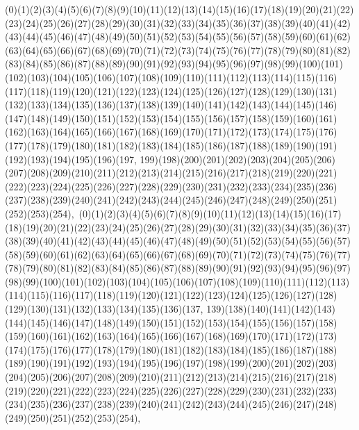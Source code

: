\documentclass[12pt]{article}
\begin{document}
{(0)(1)(2)(3)(4)(5)(6)(7)(8)(9)(10)(11)(12)(13)(14)(15)(16)(17)(18)(19)(20)(21)(22)(23)(24)(25)(26)(27)(28)(29)(30)(31)(32)(33)(34)(35)(36)(37)(38)(39)(40)(41)(42)(43)(44)(45)(46)(47)(48)(49)(50)(51)(52)(53)(54)(55)(56)(57)(58)(59)(60)(61)(62)(63)(64)(65)(66)(67)(68)(69)(70)(71)(72)(73)(74)(75)(76)(77)(78)(79)(80)(81)(82)(83)(84)(85)(86)(87)(88)(89)(90)(91)(92)(93)(94)(95)(96)(97)(98)(99)(100)(101)(102)(103)(104)(105)(106)(107)(108)(109)(110)(111)(112)(113)(114)(115)(116)(117)(118)(119)(120)(121)(122)(123)(124)(125)(126)(127)(128)(129)(130)(131)(132)(133)(134)(135)(136)(137)(138)(139)(140)(141)(142)(143)(144)(145)(146)(147)(148)(149)(150)(151)(152)(153)(154)(155)(156)(157)(158)(159)(160)(161)(162)(163)(164)(165)(166)(167)(168)(169)(170)(171)(172)(173)(174)(175)(176)(177)(178)(179)(180)(181)(182)(183)(184)(185)(186)(187)(188)(189)(190)(191)(192)(193)(194)(195)(196)(197, 199)(198)(200)(201)(202)(203)(204)(205)(206)(207)(208)(209)(210)(211)(212)(213)(214)(215)(216)(217)(218)(219)(220)(221)(222)(223)(224)(225)(226)(227)(228)(229)(230)(231)(232)(233)(234)(235)(236)(237)(238)(239)(240)(241)(242)(243)(244)(245)(246)(247)(248)(249)(250)(251)(252)(253)(254)$
, 
$
(0)(1)(2)(3)(4)(5)(6)(7)(8)(9)(10)(11)(12)(13)(14)(15)(16)(17)(18)(19)(20)(21)(22)(23)(24)(25)(26)(27)(28)(29)(30)(31)(32)(33)(34)(35)(36)(37)(38)(39)(40)(41)(42)(43)(44)(45)(46)(47)(48)(49)(50)(51)(52)(53)(54)(55)(56)(57)(58)(59)(60)(61)(62)(63)(64)(65)(66)(67)(68)(69)(70)(71)(72)(73)(74)(75)(76)(77)(78)(79)(80)(81)(82)(83)(84)(85)(86)(87)(88)(89)(90)(91)(92)(93)(94)(95)(96)(97)(98)(99)(100)(101)(102)(103)(104)(105)(106)(107)(108)(109)(110)(111)(112)(113)(114)(115)(116)(117)(118)(119)(120)(121)(122)(123)(124)(125)(126)(127)(128)(129)(130)(131)(132)(133)(134)(135)(136)(137, 139)(138)(140)(141)(142)(143)(144)(145)(146)(147)(148)(149)(150)(151)(152)(153)(154)(155)(156)(157)(158)(159)(160)(161)(162)(163)(164)(165)(166)(167)(168)(169)(170)(171)(172)(173)(174)(175)(176)(177)(178)(179)(180)(181)(182)(183)(184)(185)(186)(187)(188)(189)(190)(191)(192)(193)(194)(195)(196)(197)(198)(199)(200)(201)(202)(203)(204)(205)(206)(207)(208)(209)(210)(211)(212)(213)(214)(215)(216)(217)(218)(219)(220)(221)(222)(223)(224)(225)(226)(227)(228)(229)(230)(231)(232)(233)(234)(235)(236)(237)(238)(239)(240)(241)(242)(243)(244)(245)(246)(247)(248)(249)(250)(251)(252)(253)(254)$
, 
$
}
\end{document}
